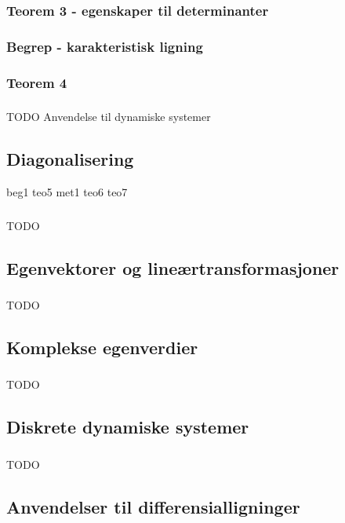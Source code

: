 \documentclass{article}
\begin{document}
      \subsubsection{Teorem 3 - egenskaper til determinanter}
        
      \subsubsection{Begrep - karakteristisk ligning}
        
      \subsubsection{Teorem 4}
        
      \subsubsection{}
        TODO Anvendelse til dynamiske systemer
    \subsection{Diagonalisering}
beg1 teo5 met1 teo6 teo7
      \subsubsection{}
        TODO
    \subsection{Egenvektorer og lineærtransformasjoner}
      \subsubsection{}
        TODO
    \subsection{Komplekse egenverdier}
      \subsubsection{}
        TODO
    \subsection{Diskrete dynamiske systemer}
      \subsubsection{}
        TODO
    \subsection{Anvendelser til differensialligninger}
\end{document}
